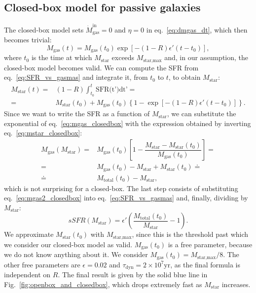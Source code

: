 \documentclass[fleqn,usenatbib]{mnras}
\begin{document}
\subsection{Closed-box model for passive galaxies}\label{sec:closed_box}
The closed-box model sets $\dot{M}_\text{gas}^\text{in}=0$ and $\eta=0$ in eq.~\ref{eq:dmgas_dt}, which then becomes trivial:
\begin{equation}
    M_\text{gas}(t) = M_\text{gas}(t_0)\exp{[-(1-R)\epsilon' (t-t_0)]},
	\label{eq:mgas_closedbox}
\end{equation}
where $t_0$ is the time at which $M_{\text{star}}$ exceeds $M_\text{star,max}$ and, in our assumption, the closed-box model becomes valid. We can compute the SFR from eq.~\ref{eq:SFR_vs_gasmas} and integrate it, from $t_0$ to $t$, to obtain $M_{\text{star}}$:
{\fontsize{8.3pt}{8.3pt}\begin{equation}
    \begin{split}
        M_\text{star}(t) = &(1-R)\int_{t_0}^{t} \text{SFR(t')dt'}=\\
        =&M_\text{star}(t_0) + M_\text{gas}(t_0)\left\{1-\exp\left[-(1-R)\epsilon' (t-t_0)\right]\right\}.
    \end{split}
	\label{eq:mstar_closedbox}
\end{equation}}
Since we want to write the SFR as a function of $M_{\text{star}}$, we can substitute the exponential of eq.~\ref{eq:mgas_closedbox} with the expression obtained by inverting eq.~\ref{eq:mstar_closedbox}:
\begin{equation}
    \begin{split}
        M_\text{gas}\left(M_\text{star}\right) =&M_\text{gas}(t_0)\left[1 - \dfrac{M_\text{star} - M_\text{star}(t_0)}{M_\text{gas}(t_0)}\right] =\\
        = & M_\text{gas}(t_0) - M_\text{star} + M_\text{star}(t_0) \doteq\\
        \doteq & M_\text{total}(t_0) - M_\text{star},
    \end{split}
	\label{eq:mgas2_closedbox}
\end{equation}
which is not surprising for a closed-box. The last step consists of substituting eq.~\ref{eq:mgas2_closedbox} into eq.~\ref{eq:SFR_vs_gasmas} and, finally, dividing by $M_{\text{star}}$:
\begin{equation}
    sSFR\left(M_\text{star}\right) = \epsilon' \left(\dfrac{M_\text{total}(t_0)}{M_\text{star}} - 1 \right).
	\label{eq:sSFR_closedbox}
\end{equation}
We approximate $M_\text{star}(t_0)$ with $M_\text{star,max}$, since this is the threshold past which we consider our closed-box model as valid. $M_\text{gas}(t_0)$ is a free parameter, because we do not know anything about it. We consider $M_\text{gas}(t_0) = M_\text{star,max}/8$. The other free parameters are $\epsilon=0.02$ and $\tau_\text{dyn}=2 \times 10^7 \text{yr}$, as the final formula is independent on $R$. The final result is given by the solid blue line in Fig.~\ref{fig:openbox_and_closedbox}, which drops extremely fast as $M_\text{star}$ increases. 
\end{document}
